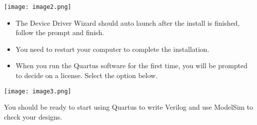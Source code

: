 \texttt{[image: image2.png]}

\begin{itemize}
\item
  The Device Driver Wizard should auto launch after the install is
  finished, follow the prompt and finish.
\item
  You need to restart your computer to complete the installation.
\item
  When you run the Quartus software for the first time, you will be
  prompted to decide on a license. Select the option below.
\end{itemize}

\texttt{[image: image3.png]}

You should be ready to start using Quartus to write Verilog and use
ModelSim to check your designs.

